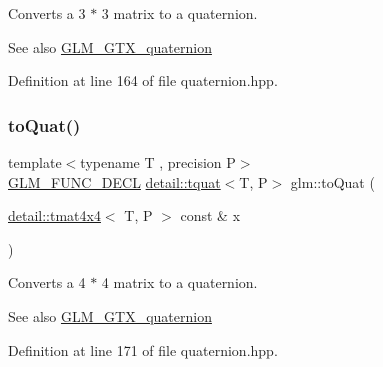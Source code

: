 Converts a 3 $\ast$ 3 matrix to a quaternion.

\begin{DoxySeeAlso}{See also}
\hyperlink{group__gtx__quaternion}{G\+L\+M\+\_\+\+G\+T\+X\+\_\+quaternion} 
\end{DoxySeeAlso}


Definition at line 164 of file quaternion.\+hpp.

\mbox{\label{group__gtx__quaternion_gab2e47ea15791ee85dfacfd9e952bad64}} 
\subsubsection{\texorpdfstring{to\+Quat()}{toQuat()}\hspace{0.1cm}{\footnotesize\ttfamily [2/2]}}
{\footnotesize\ttfamily template$<$typename T , precision P$>$ \\
\hyperlink{setup_8hpp_ab2d052de21a70539923e9bcbf6e83a51}{G\+L\+M\+\_\+\+F\+U\+N\+C\+\_\+\+D\+E\+CL} \hyperlink{structglm_1_1detail_1_1tquat}{detail\+::tquat}$<$T, P$>$ glm\+::to\+Quat (\begin{DoxyParamCaption}\item[{\hyperlink{structglm_1_1detail_1_1tmat4x4}{detail\+::tmat4x4}$<$ T, P $>$ const \&}]{x }\end{DoxyParamCaption})}

Converts a 4 $\ast$ 4 matrix to a quaternion.

\begin{DoxySeeAlso}{See also}
\hyperlink{group__gtx__quaternion}{G\+L\+M\+\_\+\+G\+T\+X\+\_\+quaternion} 
\end{DoxySeeAlso}


Definition at line 171 of file quaternion.\+hpp.

